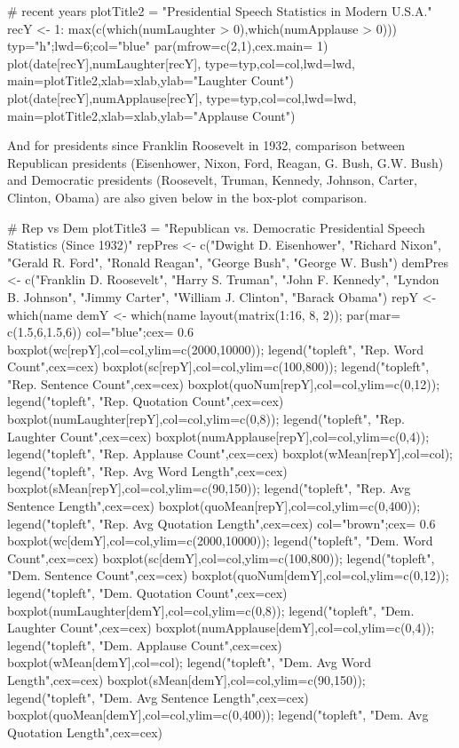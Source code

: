 \documentclass{article}
\begin{document}
# recent years
plotTitle2 = "Presidential Speech Statistics in Modern U.S.A."
recY <- 1: max(c(which(numLaughter > 0),which(numApplause > 0)))
typ="h";lwd=6;col="blue"
par(mfrow=c(2,1),cex.main= 1)
plot(date[recY],numLaughter[recY], type=typ,col=col,lwd=lwd, main=plotTitle2,xlab=xlab,ylab="Laughter Count")
plot(date[recY],numApplause[recY], type=typ,col=col,lwd=lwd, main=plotTitle2,xlab=xlab,ylab="Applause Count")

And for presidents since Franklin Roosevelt in 1932, comparison between Republican presidents 
(Eisenhower, Nixon, Ford, Reagan, G. Bush, G.W. Bush) and Democratic presidents 
(Roosevelt, Truman, Kennedy, Johnson, Carter, Clinton, Obama) are also given below in the box-plot comparison.



# Rep vs Dem
plotTitle3 = "Republican vs. Democratic Presidential Speech Statistics (Since 1932)"
repPres <- c("Dwight D. Eisenhower", "Richard Nixon", "Gerald R. Ford", 
             "Ronald Reagan", "George Bush", "George W. Bush")
demPres <- c("Franklin D. Roosevelt", "Harry S. Truman", "John F. Kennedy", 
             "Lyndon B. Johnson", "Jimmy Carter", "William J. Clinton", "Barack Obama")
repY <- which(name %
demY <- which(name %
layout(matrix(1:16, 8, 2)); par(mar= c(1.5,6,1.5,6))
col="blue";cex= 0.6
boxplot(wc[repY],col=col,ylim=c(2000,10000)); legend("topleft", "Rep. Word Count",cex=cex)
boxplot(sc[repY],col=col,ylim=c(100,800)); legend("topleft", "Rep. Sentence Count",cex=cex)
boxplot(quoNum[repY],col=col,ylim=c(0,12)); legend("topleft", "Rep. Quotation Count",cex=cex)
boxplot(numLaughter[repY],col=col,ylim=c(0,8)); legend("topleft", "Rep. Laughter Count",cex=cex)
boxplot(numApplause[repY],col=col,ylim=c(0,4)); legend("topleft", "Rep. Applause Count",cex=cex)
boxplot(wMean[repY],col=col); legend("topleft", "Rep. Avg Word Length",cex=cex)
boxplot(sMean[repY],col=col,ylim=c(90,150)); legend("topleft", "Rep. Avg Sentence Length",cex=cex)
boxplot(quoMean[repY],col=col,ylim=c(0,400)); legend("topleft", "Rep. Avg Quotation Length",cex=cex)
col="brown";cex= 0.6
boxplot(wc[demY],col=col,ylim=c(2000,10000)); legend("topleft", "Dem. Word Count",cex=cex)
boxplot(sc[demY],col=col,ylim=c(100,800)); legend("topleft", "Dem. Sentence Count",cex=cex)
boxplot(quoNum[demY],col=col,ylim=c(0,12)); legend("topleft", "Dem. Quotation Count",cex=cex)
boxplot(numLaughter[demY],col=col,ylim=c(0,8)); legend("topleft", "Dem. Laughter Count",cex=cex)
boxplot(numApplause[demY],col=col,ylim=c(0,4)); legend("topleft", "Dem. Applause Count",cex=cex)
boxplot(wMean[demY],col=col); legend("topleft", "Dem. Avg Word Length",cex=cex)
boxplot(sMean[demY],col=col,ylim=c(90,150)); legend("topleft", "Dem. Avg Sentence Length",cex=cex)
boxplot(quoMean[demY],col=col,ylim=c(0,400)); legend("topleft", "Dem. Avg Quotation Length",cex=cex)
\end{document}
